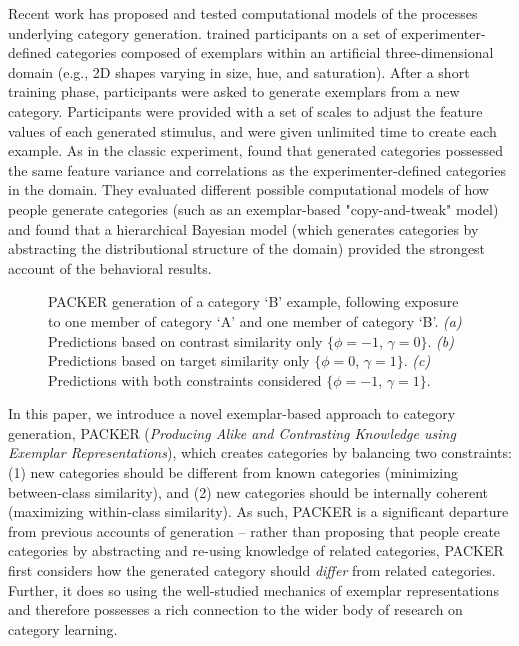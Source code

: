 \documentclass[10pt,letterpaper]{article}
\newcommand\inputpgf[2]{{
\let\pgfimageWithoutPath\pgfimage
\renewcommand{\pgfimage}[2][]{\pgfimageWithoutPath[##1]{#1/##2}}

}}
\begin{document}
Recent work has proposed and tested computational models of the processes underlying category generation. \citet{jern2013probabilistic} trained participants on a set of experimenter-defined categories composed of exemplars within an artificial three-dimensional domain (e.g., 2D shapes varying in size, hue, and saturation). After a short training phase, participants were asked to generate exemplars from a new category. Participants were provided with a set of scales to adjust the feature values of each generated stimulus, and were given unlimited time to create each example. As in the classic \cite{ward1994structured} experiment, \citet{jern2013probabilistic} found that generated categories possessed the same feature variance and correlations as the experimenter-defined categories in the domain. They evaluated different possible computational models of how people generate categories (such as an exemplar-based "copy-and-tweak" model) and found that a hierarchical Bayesian model (which generates categories by abstracting the distributional structure of the domain) provided the strongest account of the behavioral results.


\begin{figure*}
    \begin{center}
    \inputpgf{figs/}{example.spaces.pgf}
    \caption{PACKER generation of a category `B' example, following exposure to one member of category `A' and one member of category `B'. \textit{(a)} Predictions based on contrast similarity only $\{\phi = -1$, $\gamma = 0\}$. \textit{(b)} Predictions based on target similarity only $\{\phi = 0$, $\gamma = 1\}$.  \textit{(c)} Predictions with both constraints considered $\{\phi = -1$, $\gamma = 1\}$.  }
    \label{fig:example-prob-spaces}
    \end{center}
\end{figure*}

In this paper, we introduce a novel exemplar-based approach to category generation, PACKER (\textit{Producing Alike and Contrasting Knowledge using Exemplar Representations}), which creates  categories by balancing two constraints: (1) new categories should be different from known categories (minimizing between-class similarity), and (2) new categories should be internally coherent (maximizing within-class similarity). As such, PACKER is a significant departure from previous accounts of generation -- rather than proposing that people create categories by abstracting and re-using knowledge of related categories, PACKER first considers how the generated category should \textit{differ} from related categories. Further, it does so using the well-studied mechanics of exemplar representations and therefore possesses a rich connection to the wider body of research on category learning.
\end{document}
